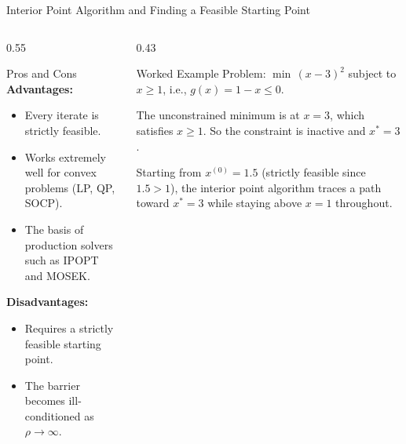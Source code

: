 \documentclass[aspectratio=169,10pt]{beamer}
\begin{document}
\begin{frame}[allowframebreaks]{Interior Point Algorithm and Finding a Feasible Starting Point}
\begin{columns}
\begin{column}{0.55\textwidth}
      \begin{block}{Pros and Cons}
        \textbf{Advantages:}
        \begin{itemize}
          \item Every iterate is strictly feasible.
          \item Works extremely well for convex problems (LP, QP, SOCP).
          \item The basis of production solvers such as IPOPT and MOSEK.
        \end{itemize}
        \textbf{Disadvantages:}
        \begin{itemize}
          \item Requires a strictly feasible starting point.
          \item The barrier becomes ill-conditioned as $\rho \to \infty$.
        \end{itemize}
      \end{block}
    \end{column}
    \begin{column}{0.43\textwidth}
      \begin{exampleblock}{Worked Example}
        Problem: $\min\,(x-3)^2$ subject to $x \ge 1$, i.e., $g(x) = 1 - x \le 0$.

        \medskip
        The unconstrained minimum is at $x = 3$, which satisfies $x \ge 1$.
        So the constraint is inactive and $x^* = 3$.

        \medskip
        Starting from $x^{(0)} = 1.5$ (strictly feasible since $1.5 > 1$),
        the interior point algorithm traces a path toward $x^* = 3$ while
        staying above $x = 1$ throughout.
      \end{exampleblock}
    \end{column}
  \end{columns}

\end{frame}
\end{document}
